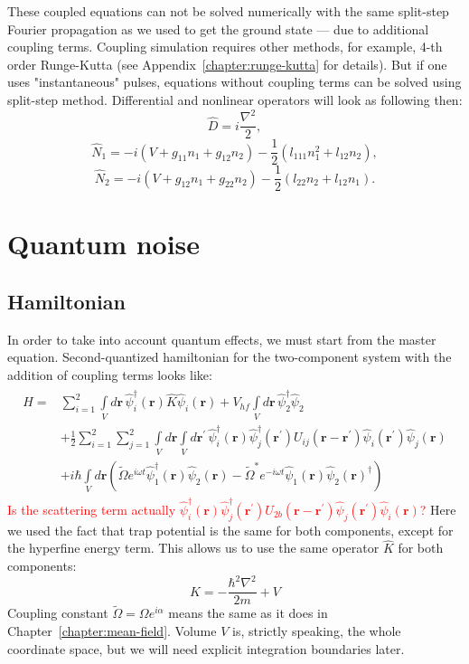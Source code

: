 \documentclass[12pt,notitlepage]{report}
\begin{document}
These coupled equations can not be solved numerically with the same split-step Fourier propagation as we used to get the ground state ---
due to additional coupling terms.
Coupling simulation requires other methods, for example, 4-th order Runge-Kutta
(see Appendix~\ref{chapter:runge-kutta} for details).
But if one uses "instantaneous" pulses, equations without coupling terms can be solved using split-step method.
Differential and nonlinear operators will look as following then:
\[ \hat{D} = i \frac{\nabla^2}{2}, \]
\[ \hat{N}_1 = -i \left( V + g_{11} n_1 + g_{12} n_2 \right) - \frac{1}{2} \left( l_{111} n_1^2 + l_{12} n_2 \right), \]
\[
\hat{N}_2 = -i \left( V + g_{12} n_1 + g_{22} n_2 \right) -
\frac{1}{2} \left( l_{22} n_2 + l_{12} n_1 \right).
\]

\chapter{Quantum noise}

\section{Hamiltonian}

In order to take into account quantum effects, we must start from the master equation.
Second-quantized hamiltonian for the two-component system with the addition of coupling terms looks like:
\begin{align}
\label{master_equation:hamiltonian}
\begin{split}
\hat{H} = {} & \sum\limits^2_{i=1}\int\limits_V d\mathbf{r} \, \hat{\psi}_i^\dagger(\mathbf{r}) \hat{K} \hat{\psi}_i(\mathbf{r}) +
	V_{hf} \int\limits_V d\mathbf{r}\, \hat{\psi}_2^\dagger \hat{\psi}_2 \\
& + \frac{1}{2} \sum\limits^2_{i=1} \sum\limits^2_{j=1} \int\limits_V d\mathbf{r} \int\limits_V d\mathbf{r}^\prime \,
	\hat{\psi}_i^\dagger (\mathbf{r}) \hat{\psi}_j^\dagger (\mathbf{r}^\prime)
	U_{ij}(\mathbf{r} - \mathbf{r}^\prime)
	\hat{\psi}_i(\mathbf{r}^\prime) \hat{\psi}_j(\mathbf{r}) \\
& + i \hbar \int\limits_V d\mathbf{r} \left(
	\tilde{\Omega} e^{i \omega t} \hat{\psi}_1^\dagger(\mathbf{r}) \hat{\psi}_2(\mathbf{r}) -
	\tilde{\Omega}^* e^{-i \omega t} \hat{\psi}_1(\mathbf{r}) \hat{\psi}_2(\mathbf{r})^\dagger
\right)
\end{split}
\end{align}
\textcolor{red}{Is the scattering term actually $\hat{\psi}_i^\dagger (\mathbf{r}) \hat{\psi}_j^\dagger (\mathbf{r}^\prime)
	U_{2b}(\mathbf{r} - \mathbf{r}^\prime)
	\hat{\psi}_j(\mathbf{r}^\prime) \hat{\psi}_i(\mathbf{r})$?}
Here we used the fact that trap potential is the same for both components, except for the hyperfine energy term.
This allows us to use the same operator $\hat{K}$ for both components:
\[ \hat{K} = - \frac{\hbar^2 \nabla^2}{2 m} + V \]
Coupling constant $\tilde{\Omega} = \Omega e^{i \alpha}$ means the same as it does in Chapter~\ref{chapter:mean-field}.
Volume $V$ is, strictly speaking, the whole coordinate space, but we will need explicit integration boundaries later.
\end{document}
